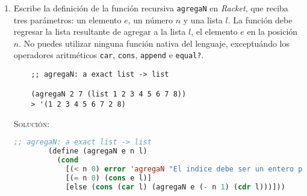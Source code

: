 \documentclass[letterpaper,11pt]{article}
\begin{document}
\begin{enumerate}
\begin{enumerate}
        \item Alcance dinámico

        La expresión que debemos evaluar es \texttt{\{foo 2\}}, por lo que
        \begin{verbatim}
        {foo 2} = {{fun {x} {* x {+ b a}}} 2}
                = {* x {+ b a}}
                = {* 2 {+ 0 1}}
                = {* 2 1}
                = 2
        \end{verbatim}

        Además, el ambiente en forma de pila correspondiente es:
        \begin{center}
            \begin{drawstack}[scale=1.6]
            \end{drawstack}
        \end{center}
    \end{enumerate}

    \newpage
    \item Escribe la definición de la función recursiva \texttt{agregaN} en 
    \textit{Racket}, que reciba tres parámetros: un elemento $e$, un número 
    $n$ y una lista $l$. La función debe regresar la lista resultante de 
    agregar a la lista $l$, el elemento $e$ en la posición $n$. No puedes 
    utilizar ninguna función nativa del lenguaje, exceptuándo los operadores
    aritméticos \texttt{car}, \texttt{cons}, \texttt{append} e \texttt{equal?}.
    \begin{verbatim}
    ;; agregaN: a exact list -> list 

    (agregaN 2 7 (list 1 2 3 4 5 6 7 8))
    > '(1 2 3 4 5 6 7 2 8)
    \end{verbatim}

    \textsc{Solución:}
    \begin{lstlisting}[language=Lisp]
        ;; agregaN: a exact list -> list
        (define (agregaN e n l)
          (cond
            [(< n 0) error 'agregaN "El indice debe ser un entero positivo."]
            [(= n 0) (cons e l)]
            [else (cons (car l) (agregaN e (- n 1) (cdr l)))]))
    \end{lstlisting}
\end{enumerate}
\end{document}
